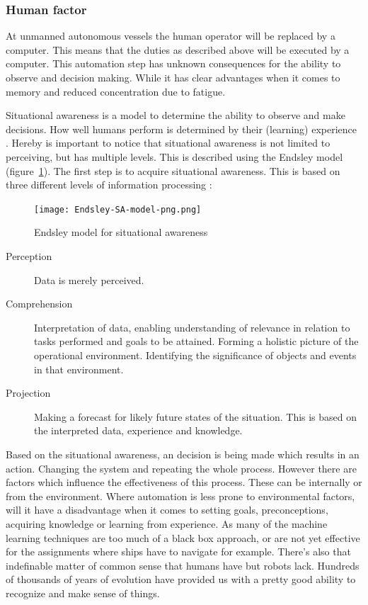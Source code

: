 \subsubsection{Human factor}
At unmanned autonomous vessels the human operator will be replaced by a computer. This means that the duties as described above will be executed by a computer. This automation step has unknown consequences for the ability to observe and decision making. While it has clear advantages when it comes to memory and reduced concentration due to fatigue.

Situational awareness is a model to determine the ability to observe and make decisions. How well humans perform is determined by their (learning) experience \cite{Underwood2013}. Hereby is important to notice that situational awareness is not limited to perceiving, but has multiple levels. This is described using the Endsley model (figure~\ref{fig:Endsley-SA-model}).
The first step is to acquire situational awareness. This is based on three different levels of information processing \cite{Kalloniatis2017}: 

\begin{figure}[p]
	\centering
	\texttt{[image: Endsley-SA-model-png.png]}
	\caption{Endsley model for situational awareness}
	\label{fig:Endsley-SA-model}
\end{figure}

\begin{description}
	\item [Perception] Data is merely perceived.
	\item [Comprehension] Interpretation of data, enabling understanding of relevance in relation to tasks performed and goals to be attained. Forming a holistic picture of the operational environment. Identifying the significance of objects and events in that environment.
	\item [Projection] Making a forecast for likely future states of the situation. This is based on the interpreted data, experience and knowledge.
\end{description}

Based on the situational awareness, an decision is being made which results in an action. Changing the system and repeating the whole process. However there are factors which influence the effectiveness of this process. These can be internally or from the environment. Where automation is less prone to environmental factors, will it have a disadvantage when it comes to setting goals, preconceptions, acquiring knowledge or learning from experience. As many of the machine learning techniques are too much of a black box approach, or are not yet effective for the assignments where ships have to navigate for example. There’s also that indefinable matter of common sense that humans have but robots lack. Hundreds of thousands of years of evolution have provided us with a pretty good ability to recognize and make sense of things.

